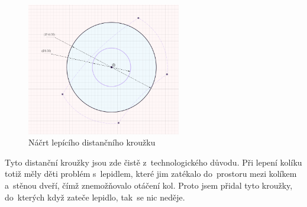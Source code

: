 \begin{figure}[h]
	\centering
    \includegraphics[width=0.6\textwidth]{kapitoly/obrazky/M3/lepici_distance.png}
    \caption{Náčrt lepícího distančního kroužku}
    \label{fig:M3-lepici-distance}
\end{figure}

Tyto distanční kroužky jsou zde čistě z~technologického důvodu. Při lepení kolíku totiž měly děti problém s~lepidlem, které jim zatékalo do~prostoru mezi kolíkem 
a~stěnou dveří, čímž znemožňovalo otáčení kol. Proto jsem přidal tyto kroužky, do~kterých když zateče lepidlo, tak~se nic neděje.
